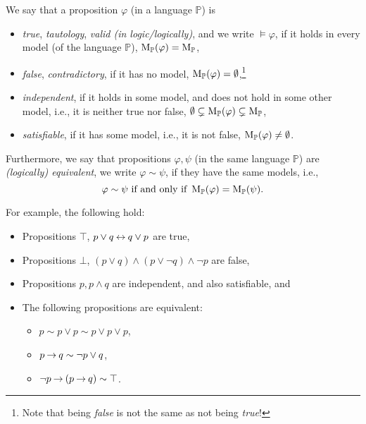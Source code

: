 \begin{definition}\label{definition:semantic-notions}
We say that a proposition $\varphi$ (in a language $\mathbb{P}$) is
\begin{itemize}
    \item \emph{true}, \emph{tautology}, \emph{valid (in logic/logically)}, and we write $\models \varphi$, if it holds in every model (of the language $\mathbb{P}$), $\operatorname{M}_\mathbb{P}(\varphi) = \operatorname{M}_\mathbb{P}$,
    \item \emph{false}, \emph{contradictory}, if it has no model, $\operatorname{M}_\mathbb{P}(\varphi) = \emptyset$,\footnote{Note that being \emph{false} is not the same as not being \emph{true}!}
    \item \emph{independent}, if it holds in some model, and does not hold in some other model, i.e., it is neither true nor false, $\emptyset \subsetneq \operatorname{M}_\mathbb{P}(\varphi) \subsetneq \operatorname{M}_\mathbb{P}$,
    \item \emph{satisfiable}, if it has some model, i.e., it is not false, $\operatorname{M}_\mathbb{P}(\varphi) \neq \emptyset$.
\end{itemize}
Furthermore, we say that propositions $\varphi, \psi$ (in the same language $\mathbb{P}$) are \emph{(logically) equivalent}, we write $\varphi \sim \psi$, if they have the same models, i.e.,
$$
\varphi \sim \psi \text{ if and only if } \operatorname{M}_\mathbb{P}(\varphi) = \operatorname{M}_\mathbb{P}(\psi).
$$    
\end{definition}

\begin{example} For example, the following hold:
    \begin{itemize}
        \item Propositions $\top$, $p \lor q \mathbin{\leftrightarrow} q \lor p$ are true,
        \item Propositions $\bot$, $(p \lor q) \land (p \lor \neg q) \land \neg p$ are false,
        \item Propositions $p, p \land q$ are independent, and also satisfiable, and
        \item The following propositions are equivalent: 
        \begin{itemize}
            \item $p \sim p \lor p \sim p \lor p \lor p$,
            \item $p \mathbin{\rightarrow} q \sim \neg p \lor q$,
            \item $\neg p \mathbin{\rightarrow} (p \mathbin{\rightarrow} q) \sim \top $.
        \end{itemize}  
    \end{itemize}      
\end{example}

